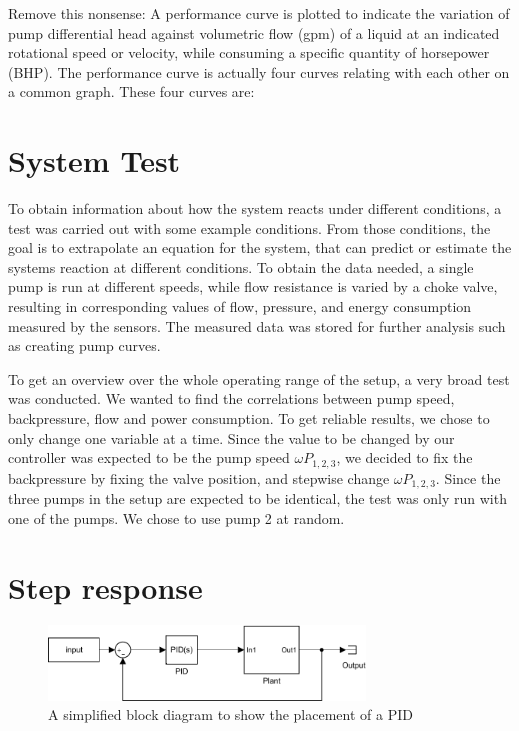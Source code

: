 
Remove this nonsense:
A performance curve is plotted to indicate the variation of pump differential head against volumetric flow (gpm) of a liquid at an indicated rotational speed or velocity, while consuming a specific quantity of horsepower (BHP). The performance curve is actually four curves relating with each other on a common graph. These four curves are:

\section{System Test}\label{sec:system_test} 
To obtain information about how the system reacts under different conditions,
a test was carried out with some example conditions.
From those conditions, the goal is to extrapolate an equation for the system,
that can predict or estimate  the systems reaction at different conditions.
To obtain the data needed,
a single pump is run at different speeds,
while flow resistance is varied by a choke valve,
resulting in corresponding values of flow, pressure, and energy consumption
measured by the sensors.
The measured data was stored for further analysis such as creating pump curves.

To get an overview over the whole operating range of the setup,
a very broad test was conducted.
We wanted to find the correlations between pump speed, backpressure, flow and power consumption.
To get reliable results, we chose to only change one variable at a time.
Since the value to be changed by our controller was expected to be the pump speed $\omega P_{1,2,3}$,
we decided to fix the backpressure by fixing the valve position,
and stepwise change $\omega P_{1,2,3}$.
Since the three pumps in the setup are expected to be identical,
the test was only run with one of the pumps.
We chose to use pump 2 at random.




\section{Step response}
\begin{figure}[H]
    \centering
    \includegraphics[width=0.75\textwidth]{figures/04ExperimentsAndLabWork/CLblock.pdf}
    \caption{A simplified block diagram to show the placement of a PID}
	\label{fig:PIDplace}
\end{figure}

